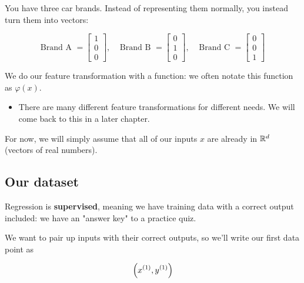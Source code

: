         \miniex You have three car brands. Instead of representing them normally, you instead turn them into vectors: 
        
        \begin{equation}
            \text{Brand A }=
            \begin{bmatrix}
              1 \\ 0 \\ 0
            \end{bmatrix},
            \;\;\;\;
            \text{Brand B }=
            \begin{bmatrix}
              0 \\ 1 \\ 0
            \end{bmatrix},
            \;\;\;\;
            \text{Brand C }=
            \begin{bmatrix}
              0 \\ 0 \\ 1
            \end{bmatrix}
        \end{equation}
        
        We do our feature transformation with a function: we often notate this function as $\varphi(x)$.

        \begin{itemize}
            \item There are many different feature transformations for different needs. We will come back to this in a later chapter. 
        \end{itemize}
        
        For now, we will simply assume that all of our inputs $x$ are already in $\mathbb R^d$ (vectors of real numbers).
        
    \subsection{Our dataset}
    
        Regression is \textbf{supervised}, meaning we have training data with a correct output included: we have an "answer key" to a practice quiz.
        
        We want to pair up inputs with their correct outputs, so we'll write our first data point as 
        
        \begin{equation*}
            \left( x^{(1)}, y^{(1)} \right)
        \end{equation*}
        
